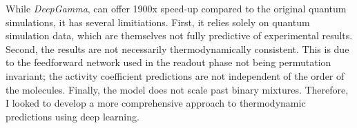 While \textit{DeepGamma}, can offer 1900x speed-up compared to the original quantum simulations, it has several limitiations. First, it relies solely on quantum simulation data, which are themselves not fully predictive of experimental results. Second, the results are not necessarily thermodynamically consistent. This is due to the feedforward network used in the readout phase not being permutation invariant; the activity coefficient predictions are not independent of the order of the molecules. Finally, the model does not scale past binary mixtures. Therefore, I looked to develop a more comprehensive approach to thermodynamic predictions using deep learning.

